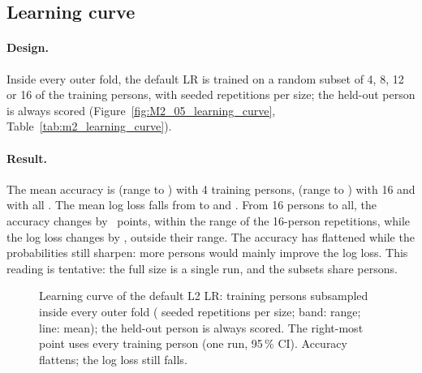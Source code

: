 \subsection{Learning curve}\label{app:m2:learning}

\paragraph{Design.} Inside every outer fold, the default LR is trained on a random subset of 4, 8, 12 or 16 of
the training persons, with  seeded repetitions per size; the held-out person is always
scored (Figure~\ref{fig:M2_05_learning_curve}, Table~\ref{tab:m2_learning_curve}).

\paragraph{Result.} The mean accuracy is  (range  to
) with 4 training persons,  (range  to
) with 16 and  with all . The mean log loss falls
from  to  and . From 16 persons to all, the accuracy
changes by ~points, within the range of the 16-person repetitions, while the log loss
changes by , outside their range. The accuracy has flattened while the probabilities
still sharpen: more persons would mainly improve the log loss. This reading is tentative: the full size is a
single run, and the subsets share persons.

\begin{figure}[tbp]
\centering
{}
\caption{Learning curve of the default L2 LR: training persons subsampled inside every outer fold
( seeded repetitions per size; band: range; line: mean); the held-out person is always
scored. The right-most point uses every training person (one run, 95\,\% CI). Accuracy flattens; the log loss
still falls.}
\label{fig:M2_05_learning_curve}\label{fig:app:m2-learning}
\end{figure}


